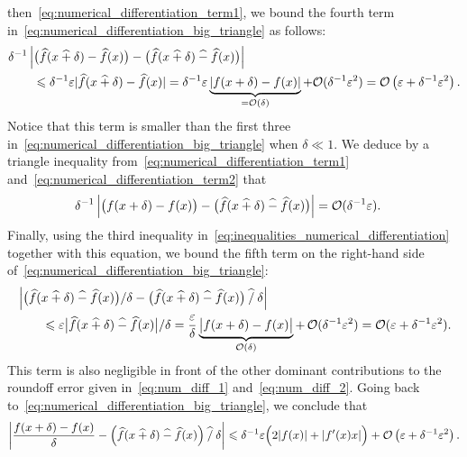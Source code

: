 \begin{solution}
    then~\eqref{eq:numerical_differentiation_term1},
    we bound the fourth term in~\eqref{eq:numerical_differentiation_big_triangle} as follows:
    \begin{align}
        \nonumber
        &\delta^{-1} \left\lvert \bigl( \widehat f(x \mathbin{\widehat +} \delta) - \widehat f(x) \bigr)  - \bigl( \widehat f(x \mathbin{\widehat +} \delta) \mathbin{\widehat -} \widehat f(x) \bigr)  \right\rvert \\
        \label{eq:numerical_differentiation_term2}
        &\qquad \leqslant \delta^{-1} \varepsilon \lvert\widehat f(x \mathbin{\widehat +} \delta) - \widehat f(x)\rvert
        = \delta^{-1} \varepsilon  \underbrace{\lvert f(x + \delta) - f(x)\rvert}_{= \mathcal O(\delta)} +  \mathcal O (\delta^{-1} \varepsilon^2)
        = \mathcal O\left(\varepsilon + \delta^{-1} \varepsilon^2\right).
    \end{align}
    Notice that this term is smaller than the first three in~\eqref{eq:numerical_differentiation_big_triangle} when $\delta \ll 1$.
    We deduce by a triangle inequality from~\eqref{eq:numerical_differentiation_term1} and~\eqref{eq:numerical_differentiation_term2} that
    \begin{align*}
        \label{eq:intermedia_numerical_derivative}
        \delta^{-1} \left\lvert \bigl( f(x + \delta) - f(x) \bigr)
        - \bigl( \widehat f(x \mathbin{\widehat +} \delta) \mathbin{\widehat -} \widehat f(x) \bigr) \right\rvert
        &= \mathcal O(\delta^{-1} \varepsilon).
    \end{align*}
    Finally, using the third inequality in~\eqref{eq:inequalities_numerical_differentiation} together with this equation,
    we bound the fifth term on the right-hand side of~\eqref{eq:numerical_differentiation_big_triangle}:
    \begin{align*}
        &\left\lvert \bigl( \widehat f(x \mathbin{\widehat +} \delta) \mathbin{\widehat -} \widehat f(x) \bigr) / \delta
        - \bigl( \widehat f(x \mathbin{\widehat +} \delta) \mathbin{\widehat -} \widehat f(x) \bigr) \mathbin{\widehat /} \delta \right\rvert \\
        &\qquad \leqslant \varepsilon \bigl\lvert  \widehat f(x \mathbin{\widehat +} \delta) \mathbin{\widehat -} \widehat f(x) \bigr \rvert / \delta
        = \frac{\varepsilon}{\delta} \underbrace{ \bigl\lvert  f(x + \delta) - f(x) \bigr \rvert }_{\mathcal O(\delta)}
        +\, \mathcal O(\delta^{-1} \varepsilon^2)
        = \mathcal O(\varepsilon + \delta^{-1} \varepsilon^2).
    \end{align*}
    This term is also negligible in front of the other dominant contributions to the roundoff error given in~\eqref{eq:num_diff_1} and~\eqref{eq:num_diff_2}.
    Going back to~\eqref{eq:numerical_differentiation_big_triangle},
    we conclude that
    \[
        \left\lvert \frac{f(x + \delta) - f(x)}{\delta} - \Bigl(\widehat f(x \mathbin{\widehat +} \delta) \mathbin{\widehat -} \widehat f(x)\Bigr) \mathbin{\widehat /} \delta \right\rvert
        \leqslant \delta^{-1} \varepsilon \Bigl( 2 \lvert f(x) \rvert + \lvert f'(x)x \rvert \Bigr) + \mathcal O\left(\varepsilon + \delta^{-1} \varepsilon^2\right).
    \]

\end{solution}
